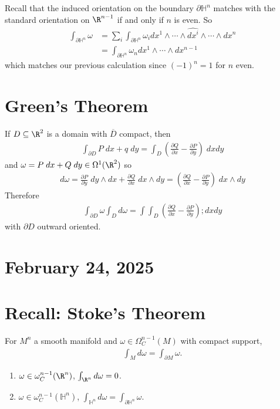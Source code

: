 \documentclass[11pt]{article}
\begin{document}
Recall that the induced orientation on the boundary \(\partial\mathbb{H}^{n}\) matches with the standard orientation on \(\R^{n-1}\) if and only if \(n\) is even. So\\
\begin{align*}
  \int_{\partial\mathbb{H}^{n}}\omega
  &=\sum_{i}\int_{\partial\mathbb{H}^{n}}\omega_{i}dx^{1}\wedge\cdots\wedge\widehat{dx^{i}}\wedge\cdots\wedge dx^{n} \\
  &=\int_{\partial\mathbb{H}^{n}}\omega_{n}dx^{1}\wedge\cdots\wedge dx^{n-1}
\end{align*}
which matches our previous calculation since \((-1)^{n}=1\) for \(n\) even.\\
\section*{Green's Theorem}
\label{sec:orgf1c3c43}
If \(D\subseteq\R^{2}\) is a domain with \(\overline{D}\) compact, then\\
\begin{align*}
  \int_{\partial D}P\;dx+q\;dy
  =\int_{D}\left( \frac{\partial Q}{\partial x}-\frac{\partial P}{\partial y} \right)\;dxdy
\end{align*}
and \(\omega=P\;dx+Q\;dy\in\Omega^{1}(\R^{2})\) so\\
\begin{align*}
  d\omega
  =\frac{\partial P}{\partial y}\;dy\wedge dx+\frac{\partial Q}{\partial x}\;dx\wedge dy
  =\left( \frac{\partial Q}{\partial x}-\frac{\partial P}{\partial y} \right)\;dx\wedge dy
\end{align*}
Therefore\\
\begin{align*}
  \int_{\partial D}\omega
  \int_{D}d\omega
  =\int\int_{D}\left( \frac{\partial Q}{\partial x}-\frac{\partial P}{\partial y} \right);dxdy
\end{align*}
with \(\partial D\) outward oriented.\\
\section*{February 24, 2025}
\label{sec:org8ab3d34}
\section*{Recall: Stoke's Theorem}
\label{sec:org8786ff0}
For \(M^{n}\) a smooth manifold and \(\omega\in\Omega^{n-1}_{C}(M)\) with compact support,\\
\begin{align*}
  \int_{M}d\omega
  =\int_{\partial M}\omega.
\end{align*}
\begin{enumerate}
\item \(\omega\in\omega^{n-1}_{C}(\R^{n})\), \(\int_{\R^{n}}d\omega=0\).\\
\item \(\omega\in\omega^{n-1}_{C}(\mathbb{H}^{n})\), \(\int_{\mathbb{H}^{n}}d\omega=\int_{\partial\mathbb{H}^{n}}\omega\).\\
\end{enumerate}
\end{document}
